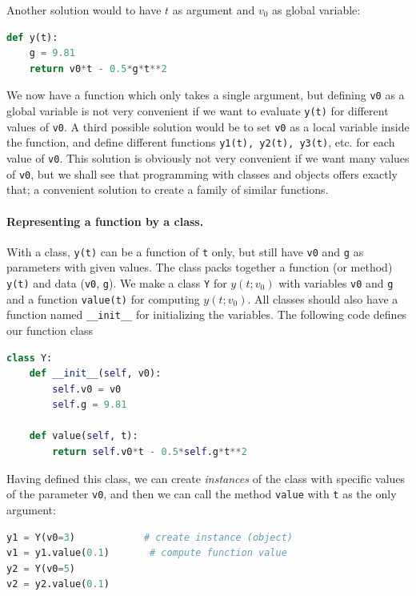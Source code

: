 \documentclass[graybox,envcountchap,sectrefs,final]{svmonodo}
\begin{document}
Another solution would to have $t$ as argument and $v_0$ as global variable:
\begin{lstlisting}[language=Python,style=blue1]
def y(t):
    g = 9.81
    return v0*t - 0.5*g*t**2
\end{lstlisting}
We now have a function which only takes a single argument, but defining \texttt{v0} as a global variable is not very convenient
if we want to evaluate \texttt{y(t)} for different values of \texttt{v0}. A third possible solution would be to set
\texttt{v0} as a local variable inside the function, and define different functions \texttt{y1(t), y2(t), y3(t)}, etc. for each value
of \texttt{v0}. This solution is obviously not very convenient if we want many values of \texttt{v0}, but we shall see that programming
with classes and objects offers exactly that; a convenient solution to create a family of similar functions.




\paragraph{Representing a function by a class.}
With a class, \texttt{y(t)} can be a function of \texttt{t} only, but still have \texttt{v0} and \texttt{g} as parameters with given values.
The class packs together a function (or method) \texttt{y(t)} and data (\texttt{v0}, \texttt{g}).
We make a class \texttt{Y} for $y(t;v_0)$ with variables \texttt{v0} and \texttt{g} and a function \texttt{value(t)} for computing $y(t;v_0)$.
All classes should also have a function named \Verb!__init__! for initializing the variables. The following code defines our function class
\begin{lstlisting}[language=Python,style=blue1]
class Y:
    def __init__(self, v0):
        self.v0 = v0
        self.g = 9.81

    def value(self, t):
        return self.v0*t - 0.5*self.g*t**2
\end{lstlisting}
Having defined this class, we can create \emph{instances} of the class with specific values of the parameter \texttt{v0}, and then
we can call the method \texttt{value} with \texttt{t} as the only argument:
\begin{lstlisting}[language=Python,style=blue1]
y1 = Y(v0=3)            # create instance (object)
v1 = y1.value(0.1)       # compute function value
y2 = Y(v0=5)
v2 = y2.value(0.1)
\end{lstlisting}
\end{document}
